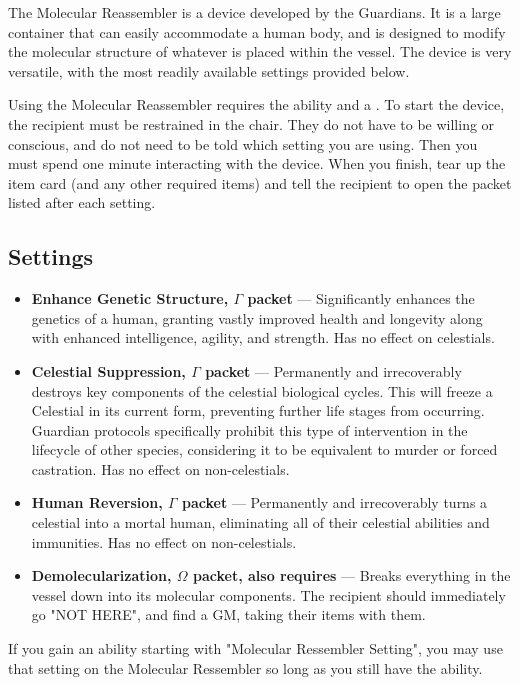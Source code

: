 \documentclass[green]{guardians}
\begin{document}
\name{\gReassembler{}}

The Molecular Reassembler is a device developed by the Guardians. It is a large container that can easily accommodate a human body, and is designed to modify the molecular structure of whatever is placed within the vessel. The device is very versatile, with the most readily available settings provided below.

Using the Molecular Reassembler requires the \aGuardianTech{} ability and a \iCoil{}. To start the device, the recipient must be restrained in the chair. They do not have to be willing or conscious, and do not need to be told which setting you are using. Then you must spend one minute interacting with the device. When you finish, tear up the \iCoil{} item card (and any other required items) and tell the recipient to open the packet listed after each setting.

\subsection{Settings}

\begin{itemize}
  \item \textbf{Enhance Genetic Structure, $\Gamma$ packet} --- Significantly enhances the genetics of a human, granting vastly improved health and longevity along with enhanced intelligence, agility, and strength. Has no effect on celestials.
  \item \textbf{Celestial Suppression, $\Gamma$ packet} --- Permanently and irrecoverably destroys key components of the celestial biological cycles. This will freeze a Celestial in its current form, preventing further life stages from occurring. Guardian protocols specifically prohibit this type of intervention in the lifecycle of other species, considering it to be equivalent to murder or forced castration. Has no effect on non-celestials.
	\item \textbf{Human Reversion, $\Gamma$ packet} --- Permanently and irrecoverably turns a celestial into a mortal human, eliminating all of their celestial abilities and immunities. Has no effect on non-celestials.
	\item \textbf{Demolecularization, $\Omega$ packet, also requires \iMagnetite{}} --- Breaks everything in the vessel down into its molecular components. The recipient should immediately go "NOT HERE", and find a GM, taking their items with them.
	
\end{itemize}

If you gain an ability starting with "Molecular Ressembler Setting", you may use that setting on the Molecular Ressembler so long as you still have the \aGuardianTech{} ability.
\end{document}
